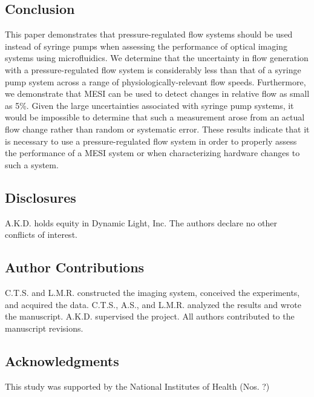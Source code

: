 \documentclass[12pt]{spieman}
\begin{document}
\begin{spacing}{2}
\blindtext


\section{Conclusion}
\label{sect:conclusion}

This paper demonstrates that pressure-regulated flow systems should be used instead of syringe pumps when assessing the performance of optical imaging systems using microfluidics. We determine that the uncertainty in flow generation with a pressure-regulated flow system is considerably less than that of a syringe pump system across a range of physiologically-relevant flow speeds. Furthermore, we demonstrate that MESI can be used to detect changes in relative flow as small as 5\%. Given the large uncertainties associated with syringe pump systems, it would be impossible to determine that such a measurement arose from an actual flow change rather than random or systematic error. These results indicate that it is necessary to use a pressure-regulated flow system in order to properly assess the performance of a MESI system or when characterizing hardware changes to such a system.


\subsection*{Disclosures}
A.K.D. holds equity in Dynamic Light, Inc. The authors declare no other conflicts of interest.

\subsection*{Author Contributions}
C.T.S. and L.M.R. constructed the imaging system, conceived the experiments, and acquired the data. C.T.S., A.S., and L.M.R. analyzed the results and wrote the manuscript. A.K.D. supervised the project. All authors contributed to the manuscript revisions.

\subsection*{Acknowledgments}
This study was supported by the National Institutes of Health (Nos. ?)


\end{spacing}
\end{document}
